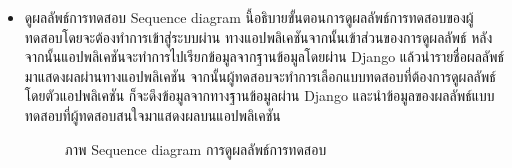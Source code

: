 \documentclass[12pt,oneside,openright,a4paper]{cpe-thai-project}
\begin{document}
\begin{itemize}
\begin{table}[!h]
\begin{tabular}{|p{4cm}|p{10cm}|}
      \end{tabular}
      \end{table}
    \newpage
    \item ดูผลลัพธ์การทดสอบ
    Sequence diagram นี้อธิบายขั้นตอนการดูผลลัพธ์การทดสอบของผู้ทดสอบโดยจะต้องทำการเข้าสู่ระบบผ่าน ทางแอปพลิเคชันจากนั้นเข้าส่วนของการดูผลลัพธ์ 
    หลังจากนั้นแอปพลิเคชันจะทำการไปเรียกข้อมูลจากฐานข้อมูลโดยผ่าน Django แล้วนำรายชื่อผลลัพธ์มาแสดงผลผ่านทางแอปพลิเคชัน 
    จากนั้นผู้ทดสอบจะทำการเลือกแบบทดสอบที่ต้องการดูผลลัพธ์ โดยตัวแอปพลิเคชัน ก็จะดึงข้อมูลจากทางฐานข้อมูลผ่าน Django และนำข้อมูลของผลลัพธ์แบบทดสอบที่ผู้ทดสอบสนใจมาแสดงผลบนแอปพลิเคชัน
    \begin{figure}[!ht]\centering
      \setlength{\fboxrule}{0.2mm} %
      \setlength{\fboxsep}{1cm}
      \caption{ภาพ Sequence diagram การดูผลลัพธ์การทดสอบ}\label{fig:activity2}
     \end{figure}
     

\end{itemize}
\end{document}

